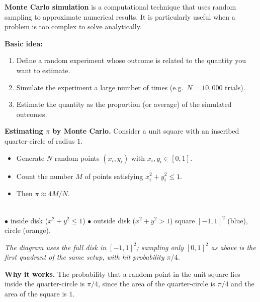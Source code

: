 
\textbf{Monte Carlo simulation} is a computational technique that uses random sampling to approximate numerical results. It is particularly useful when a problem is too complex to solve analytically.

\textbf{Basic idea:}
\begin{enumerate}[leftmargin=*]
  \item Define a random experiment whose outcome is related to the quantity you want to estimate.
  \item Simulate the experiment a large number of times (e.g.\ $N = 10{,}000$ trials).
  \item Estimate the quantity as the proportion (or average) of the simulated outcomes.
\end{enumerate}

\textbf{Estimating $\pi$ by Monte Carlo.} Consider a unit square with an inscribed quarter-circle of radius $1$.
\begin{itemize}[leftmargin=*]
  \item Generate $N$ random points $(x_i, y_i)$ with $x_i, y_i \in [0,1]$.
  \item Count the number $M$ of points satisfying $x_i^2 + y_i^2 \leq 1$.
  \item Then $\pi \approx 4M/N$.
\end{itemize}

\begin{center}
\\[0.35em]
{\small
\textcolor{green!50!black}{$\bullet$} inside disk ($x^2+y^2\le 1$)\quad
\textcolor{magenta!75!black}{$\bullet$} outside disk ($x^2+y^2>1$)\quad
square $[-1,1]^2$ \textcolor{blue!70!black}{(blue)}, circle \textcolor{orange!80!black}{(orange)}.}
\end{center}
\noindent\textit{The diagram uses the full disk in $[-1,1]^2$; sampling only $[0,1]^2$ as above is the first quadrant of the same setup, with hit probability $\pi/4$.}

\textbf{Why it works.} The probability that a random point in the unit square lies inside the quarter-circle is $\pi/4$, since the area of the quarter-circle is $\pi/4$ and the area of the square is $1$.

